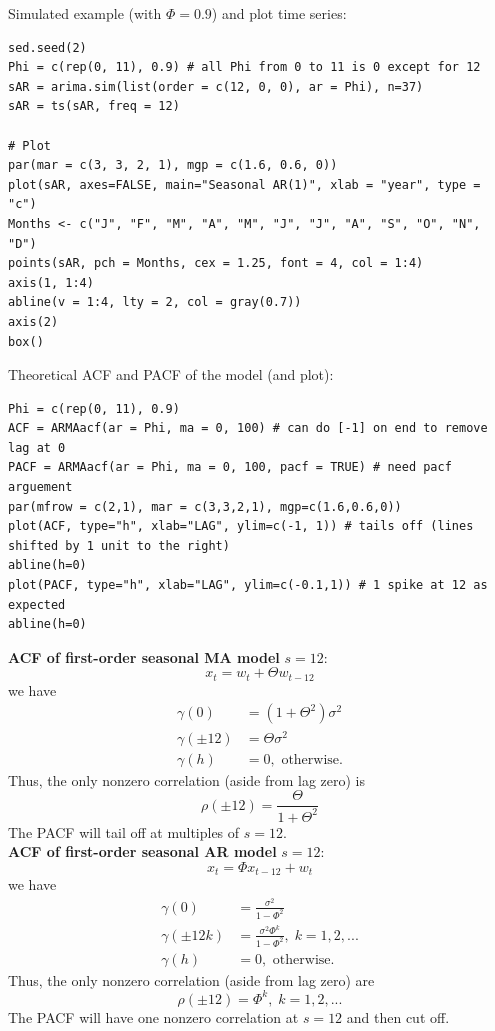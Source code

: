 \documentclass[11pt]{article}
\newcommand{\noi}{\noindent}
\begin{document}
\noi Simulated example (with $\Phi = 0.9$) and plot time series:
\begin{lstlisting}
sed.seed(2)
Phi = c(rep(0, 11), 0.9) # all Phi from 0 to 11 is 0 except for 12
sAR = arima.sim(list(order = c(12, 0, 0), ar = Phi), n=37)
sAR = ts(sAR, freq = 12)

# Plot
par(mar = c(3, 3, 2, 1), mgp = c(1.6, 0.6, 0))
plot(sAR, axes=FALSE, main="Seasonal AR(1)", xlab = "year", type = "c")
Months <- c("J", "F", "M", "A", "M", "J", "J", "A", "S", "O", "N", "D")
points(sAR, pch = Months, cex = 1.25, font = 4, col = 1:4)
axis(1, 1:4)
abline(v = 1:4, lty = 2, col = gray(0.7))
axis(2)
box()
\end{lstlisting}
\noi Theoretical ACF and PACF of the model (and plot):
\begin{lstlisting}
Phi = c(rep(0, 11), 0.9)
ACF = ARMAacf(ar = Phi, ma = 0, 100) # can do [-1] on end to remove lag at 0
PACF = ARMAacf(ar = Phi, ma = 0, 100, pacf = TRUE) # need pacf arguement
par(mfrow = c(2,1), mar = c(3,3,2,1), mgp=c(1.6,0.6,0))
plot(ACF, type="h", xlab="LAG", ylim=c(-1, 1)) # tails off (lines shifted by 1 unit to the right)
abline(h=0)
plot(PACF, type="h", xlab="LAG", ylim=c(-0.1,1)) # 1 spike at 12 as expected
abline(h=0)
\end{lstlisting}

\noi \textbf{ACF of first-order seasonal MA model} $s=12$:
$$x_t = w_t + \Theta w_{t-12}$$
\noi we have
\begin{align*}
    \gamma(0) &= (1 + \Theta^2)\sigma^2 \\
    \gamma(\pm12) &= \Theta \sigma^2 \\
    \gamma(h) &= 0, \text{ otherwise}.
\end{align*}
\noi Thus, the only nonzero correlation (aside from lag zero) is
$$\rho(\pm12) = \frac{\Theta}{1+\Theta^2}$$
\noi The PACF will tail off at multiples of $s=12$. \\

\noi \textbf{ACF of first-order seasonal AR model} $s=12$:
$$x_t = \Phi x_{t-12} + w_t$$
\noi we have
\begin{align*}
    \gamma(0) &= \frac{\sigma^2}{1 - \Phi^2} \\
    \gamma(\pm12k) &= \frac{\sigma^2\Phi^k}{1 - \Phi^2}, \; k=1,2,... \\
    \gamma(h) &= 0, \text{ otherwise}.
\end{align*}
\noi Thus, the only nonzero correlation (aside from lag zero) are
$$\rho(\pm12) = \Phi^k, \; k=1,2,...$$
\noi The PACF will have one nonzero correlation at $s=12$ and then cut off.
\end{document}
